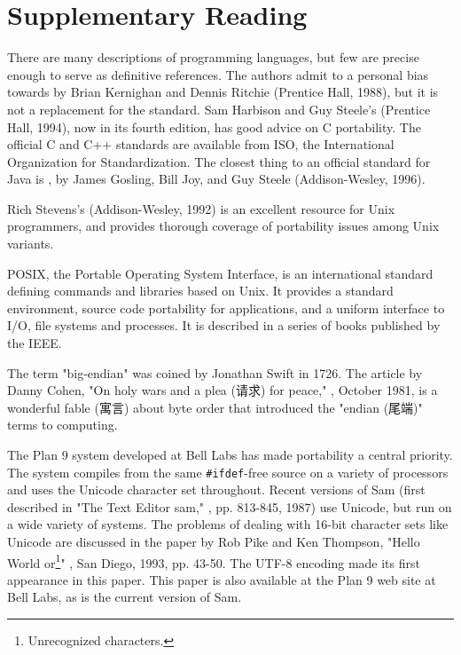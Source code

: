 \section*{Supplementary Reading}

There are many descriptions of programming languages, but few are precise
enough to serve as definitive references. The authors admit to a personal
bias towards  by Brian Kernighan and
Dennis Ritchie (Prentice Hall, 1988), but it is not a replacement for the
standard. Sam Harbison and Guy Steele's 
(Prentice Hall, 1994), now in its fourth edition, has good advice on C
portability. The official C and C++ standards are available from ISO, the
International Organization for Standardization. The closest thing to an
official standard for Java is ,
by James Gosling, Bill Joy, and Guy Steele (Addison-Wesley, 1996).

Rich Stevens's 
(Addison-Wesley, 1992) is an excellent resource for Unix programmers, and
provides thorough coverage of portability issues among Unix variants.

POSIX, the Portable Operating System Interface, is an international
standard defining commands and libraries based on Unix. It provides a
standard environment, source code portability for applications, and a
uniform interface to I/O, file systems and processes. It is described in a
series of books published by the IEEE.

The term "big-endian" was coined by Jonathan Swift in 1726. The article by
Danny Cohen, "On holy wars and a plea (请求) for peace," , October 1981, is a wonderful fable (寓言) about byte order
that introduced the "endian (尾端)" terms to computing.

The Plan 9 system developed at Bell Labs has made portability a central
priority.  The system compiles from the same \verb'#ifdef'-free source on a
variety of processors and uses the Unicode character set throughout. Recent
versions of Sam (first described in "The Text Editor sam,"
, pp. 813-845, 1987)
use Unicode, but run on a wide variety of systems. The problems of dealing
with 16-bit character sets like Unicode are discussed in the paper by Rob
Pike and
Ken Thompson, "Hello World or\footnote{Unrecognized characters.}"
, San Diego,
1993, pp. 43-50. The UTF-8 encoding made its first appearance in this
paper. This paper is also available at the Plan 9 web site at Bell Labs, as
is the current version of Sam.

